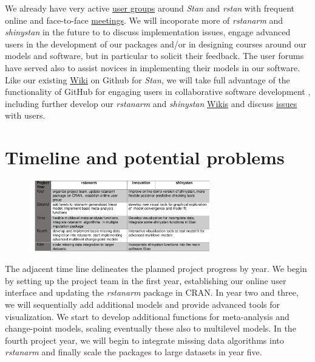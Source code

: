 \documentclass[11pt,notitlepage]{article}
\begin{document}
We already have very active \href{https://groups.google.com/forum/#!forum/stan-users} {user groups} around \textit{Stan} and 
\textit{rstan}  with frequent online and face-to-face \href{http://www.meetup.com/bda-group/}{meetings}. We will incoporate more of
\textit{rstanarm} and \textit{shinystan} in the future to to discuss implementation issues, engage advanced users in the development of 
our packages and/or in designing courses around our models and software, but in particular to solicit their feedback. The user 
forums have served also to assist novices in implementing their models in our software.
Like our existing \href{https://github.com/stan-dev/example-models/wiki}{Wiki} on Github for \textit{Stan}, we will 
take full advantage of the functionality of GitHub for engaging users in collaborative software development \cite{loeliger2012version}, 
including further develop our \textit{rstanarm} and \textit{shinystan} 
\href{https://github.com/stan-dev/rstanarm/wiki}{Wikis} and discuss \href{https://github.com/stan-dev/rstanarm/issues}{issues} with users.

\section*{Timeline and potential problems}

\begin{figure} %
    \centering
\includegraphics[width=0.7\textwidth]{Figures/Timeline.pdf}
\end{figure}

The adjacent time line delineates the planned project progress by year. We begin by setting up the project team in the first year, 
establishing our online user interface and updating the \textit{rstanarm} package in CRAN. In year two and three, we will sequentially 
add additional models and provide advanced tools for visualization. We start to develop additional functions for meta-analysis and 
change-point models, scaling eventually these also to multilevel models. In the fourth project year, we will begin to integrate 
missing data algorithms into \textit{rstanarm} and finally scale the packages to large datasets in year five.
\end{document}
